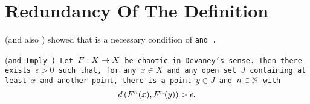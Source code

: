 \documentclass[10pt,draft,twoside]{book}
\begin{document}

\section{Redundancy Of The Definition}
\citet{silverman} (and also \citet{banks}) showed that \sdic is a necessary condition of \tt and \dpp.
\begin{theorem}
  (\tt and \dpp Imply \sdic)
  Let $F: X\rightarrow X$ be chaotic in Devaney's sense.
  Then there exists $\epsilon > 0$ such that, for any $x\in X$ and any open set $J$ containing at least $x$ and another point, there is a point $y\in J$ and $n\in \mathbb{N}$ with
  \begin{equation*}
    d\left( F^{n}(x),F^{n}(y) \right) > \epsilon.
  \end{equation*}
  \label{thm:silverman}
\end{theorem}
\end{document}
